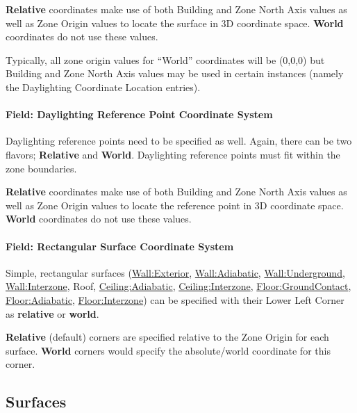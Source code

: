 \textbf{Relative} coordinates make use of both Building and Zone North Axis values as well as Zone Origin values to locate the surface in 3D coordinate space. \textbf{World} coordinates do not use these values.

Typically, all zone origin values for ``World'' coordinates will be (0,0,0) but Building and Zone North Axis values may be used in certain instances (namely the Daylighting Coordinate Location entries).

\paragraph{Field: Daylighting Reference Point Coordinate System}\label{field-daylighting-reference-point-coordinate-system}

Daylighting reference points need to be specified as well. Again, there can be two flavors; \textbf{Relative} and \textbf{World}. Daylighting reference points must fit within the zone boundaries.

\textbf{Relative} coordinates make use of both Building and Zone North Axis values as well as Zone Origin values to locate the reference point in 3D coordinate space. \textbf{World} coordinates do not use these values.

\paragraph{Field: Rectangular Surface Coordinate System}\label{field-rectangular-surface-coordinate-system}

Simple, rectangular surfaces (\hyperref[wallexterior]{Wall:Exterior}, \hyperref[walladiabatic]{Wall:Adiabatic}, \hyperref[wallunderground]{Wall:Underground}, \hyperref[wallinterzone]{Wall:Interzone}, Roof, \hyperref[ceilingadiabatic]{Ceiling:Adiabatic}, \hyperref[ceilinginterzone]{Ceiling:Interzone}, \hyperref[floorgroundcontact]{Floor:GroundContact}, \hyperref[flooradiabatic]{Floor:Adiabatic}, \hyperref[floorinterzone]{Floor:Interzone}) can be specified with their Lower Left Corner as \textbf{relative} or \textbf{world}.

\textbf{Relative} (default) corners are specified relative to the Zone Origin for each surface. \textbf{World} corners would specify the absolute/world coordinate for this corner.

\subsection{Surfaces}\label{surfaces-1}

